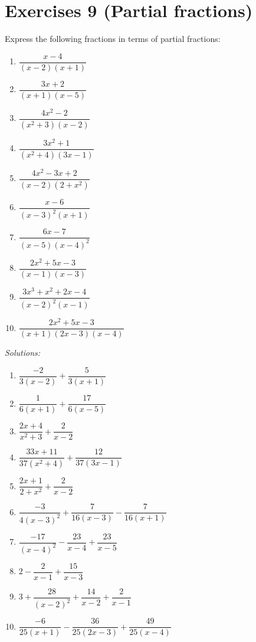 \documentclass[
  12pt,
  oneside]{book}
\providecommand{\tightlist}{%
  \setlength{\itemsep}{0pt}\setlength{\parskip}{0pt}}
\theoremstyle{definition}
\theoremstyle{definition}
\theoremstyle{definition}
\theoremstyle{definition}
\theoremstyle{remark}
\begin{document}
\hypertarget{exercises-9-partial-fractions}{%
\chapter*{Exercises 9 (Partial fractions)}\label{exercises-9-partial-fractions}}

Express the following fractions in terms of partial fractions:

\begin{enumerate}
\def\labelenumi{\roman{enumi})}
\tightlist
\item
  \(\dfrac{x-4}{(x-2)(x+1)}\)
\item
  \(\dfrac{3x+2}{(x+1)(x-5)}\)
\item
  \(\dfrac{4x^2-2}{(x^2+3)(x-2)}\)
\item
  \(\dfrac{3x^2+1}{(x^2+4)(3x-1)}\)
\item
  \(\dfrac{4x^2-3x+2}{(x-2)(2+x^2)}\)
\item
  \(\dfrac{x-6}{(x-3)^2(x+1)}\)
\item
  \(\dfrac{6x-7}{(x-5)(x-4)^2}\)
\item
  \(\dfrac{2x^2+5x-3}{(x-1)(x-3)}\)
\item
  \(\dfrac{3x^3+x^2+2x-4}{(x-2)^2(x-1)}\)
\item
  \(\dfrac{2x^2+5x-3}{(x+1)(2x-3)(x-4)}\)
\end{enumerate}

\emph{Solutions:}

\begin{enumerate}
\def\labelenumi{\roman{enumi})}
\tightlist
\item
  \(\dfrac{-2}{3(x-2)}+\dfrac 5{3(x+1)}\)
\item
  \(\dfrac 1{6(x+1)}+\dfrac{17}{6(x-5)}\)
\item
  \(\dfrac{2x+4}{x^2+3}+\dfrac 2{x-2}\)
\item
  \(\dfrac{33x+11}{37(x^2+4)}+\dfrac{12}{37(3x-1)}\)
\item
  \(\dfrac{2x+1}{2+x^2}+\dfrac 2{x-2}\)
\item
  \(\dfrac{-3}{4(x-3)^2}+\dfrac 7{16(x-3)}-\dfrac 7{16(x+1)}\)
\item
  \(\dfrac{-17}{(x-4)^2}-\dfrac{23}{x-4}+\dfrac{23}{x-5}\)
\item
  \(2-\dfrac 2{x-1}+\dfrac{15}{x-3}\)
\item
  \(3+\dfrac{28}{(x-2)^2}+\dfrac{14}{x-2}+\dfrac 2{x-1}\)
\item
  \(\dfrac{-6}{25(x+1)}-\dfrac{36}{25(2x-3)}+\dfrac{49}{25(x-4)}\)
\end{enumerate}
\end{document}
